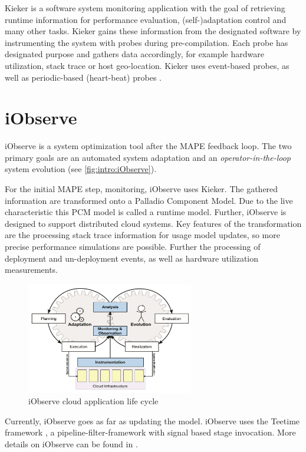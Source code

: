 Kieker is a software system monitoring application with the goal of retrieving runtime information for performance evaluation, (self-)adaptation control and many other tasks. Kieker gains these information from the designated software by instrumenting the system with probes during pre-compilation. Each probe has designated purpose and gathers data accordingly, for example hardware utilization, stack trace or host geo-location. Kieker uses event-based probes, as well as periodic-based (heart-beat) probes \cite{kieker.web}.


\section{iObserve}
\label{sec:Foundations:iobserve}

iObserve is a system optimization tool after the MAPE feedback loop. The two primary goals are an automated system adaptation and an \textit{operator-in-the-loop} system evolution (see \autoref{fig:intro:iObserve}).

For the initial MAPE step, monitoring, iObserve uses Kieker. The gathered information are transformed onto a Palladio Component Model. Due to the live characteristic this PCM model is called a runtime model. Further, iObserve is designed to support distributed cloud systems. Key features of the transformation are the processing stack trace information for usage model updates, so more precise performance simulations are possible. Further the processing of deployment and un-deployment events, as well as hardware utilization  measurements.

\begin{figure}[h]
	\centering
	\includegraphics[width=0.65\textwidth]{pictures/iObserve_principle}
	\caption{iObserve cloud application life cycle \cite{Heinrich.2016b}}
	\label{fig:intro:iObserve}
\end{figure}

Currently, iObserve goes as far as updating the model. iObserve uses the Teetime framework \cite{teetime.16.05.2017}, a pipeline-filter-framework with signal based stage invocation. More details on iObserve can be found in \cite{Heinrich.2016b}\cite{Heinrich.2016}.

